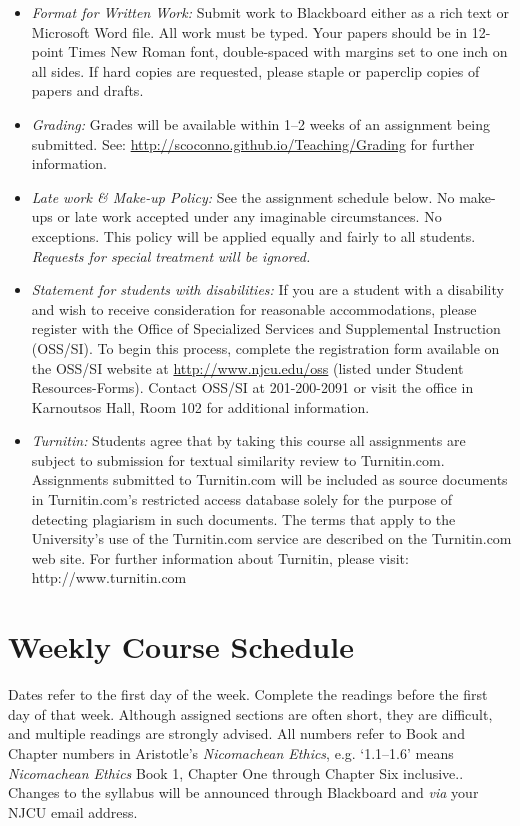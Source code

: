 \documentclass[article,oneside]{memoir}
\begin{document}
\begin{itemize}
\item \textit{Format for Written Work:} Submit work to Blackboard either as a rich text or Microsoft Word file. All work must be typed. Your papers should be in 12-point Times New Roman font, double-spaced with margins set to one inch on all sides. If hard copies are requested, please staple or paperclip copies of papers and drafts.

\item \textit{Grading:} Grades will be available within 1--2 weeks of an assignment being submitted. See: \href{http://scoconno.github.io/Teaching/Grading}{http://scoconno.github.io/Teaching/Grading} for further information.


\item \textit{Late work \& Make-up Policy:} See the assignment schedule below. No make-ups or late work accepted under any imaginable circumstances. No exceptions. This policy will be applied equally and fairly to all students. \emph{Requests for special treatment will be ignored.}

\item \textit{Statement for students with disabilities:} If you are a student with a disability and wish to receive consideration for reasonable accommodations, please register with the Office of Specialized Services and Supplemental Instruction (OSS/SI). To begin this process, complete the registration form available on the OSS/SI website at \href{http://www.njcu.edu/oss}{http://www.njcu.edu/oss} (listed under Student Resources-Forms). Contact OSS/SI at 201-200-2091 or visit the office in Karnoutsos Hall, Room 102 for additional information.

\item \textit{Turnitin:} Students agree that by taking this course all assignments are subject to submission for textual similarity review to Turnitin.com. Assignments submitted to Turnitin.com will be included as source documents in Turnitin.com's restricted access database solely for the purpose of detecting plagiarism in such documents.  The terms that apply to the University’s use of the Turnitin.com service are described on the Turnitin.com web site.  For further information about Turnitin, please visit: http://www.turnitin.com 


\end{itemize}



\section{Weekly Course Schedule}
Dates refer to the first day of the week. Complete the readings before the first day of that week.  Although assigned sections are often short, they are difficult, and multiple readings are strongly advised.  All numbers refer to Book and Chapter numbers in Aristotle's \emph{Nicomachean Ethics}, e.g.  `1.1--1.6' means \emph{Nicomachean Ethics} Book 1, Chapter One through Chapter Six inclusive.. Changes to the syllabus will be announced through Blackboard and \emph{via} your NJCU email address.  \newline
\end{document}
